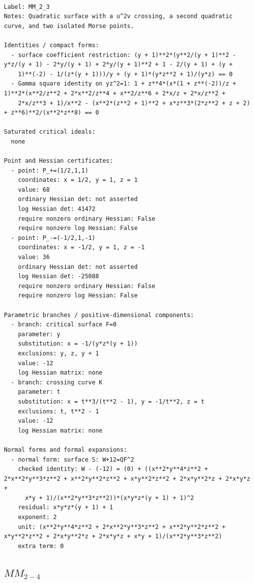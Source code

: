 \documentclass[10pt,a4paper]{article}
\begin{document}
\begin{lstlisting}

Label: MM_2_3
Notes: Quadratic surface with a u^2v crossing, a second quadratic curve, and two isolated Morse points.

Identities / compact forms:
  - surface coefficient restriction: (y + 1)**2*(y**2/(y + 1)**2 - y*z/(y + 1) - 2*y/(y + 1) + 2*y/(y + 1)**2 + 1 - 2/(y + 1) + (y +
    1)**(-2) - 1/(z*(y + 1)))/y + (y + 1)*(y*z**2 + 1)/(y*z) == 0
  - Gamma square identity on yz^2=1: 1 + z**4*(x*(1 + z**(-2))/z + 1)**2*(x**2/z**2 + 2*x**2/z**4 + x**2/z**6 + 2*x/z + 2*x/z**2 +
    2*x/z**3 + 1)/x**2 - (x**2*(z**2 + 1)**2 + x*z**3*(2*z**2 + z + 2) + z**6)**2/(x**2*z**8) == 0

Saturated critical ideals:
  none

Point and Hessian certificates:
  - point: P_+=(1/2,1,1)
    coordinates: x = 1/2, y = 1, z = 1
    value: 68
    ordinary Hessian det: not asserted
    log Hessian det: 41472
    require nonzero ordinary Hessian: False
    require nonzero log Hessian: False
  - point: P_-=(-1/2,1,-1)
    coordinates: x = -1/2, y = 1, z = -1
    value: 36
    ordinary Hessian det: not asserted
    log Hessian det: -25088
    require nonzero ordinary Hessian: False
    require nonzero log Hessian: False

Parametric branches / positive-dimensional components:
  - branch: critical surface F=0
    parameter: y
    substitution: x = -1/(y*z*(y + 1))
    exclusions: y, z, y + 1
    value: -12
    log Hessian matrix: none
  - branch: crossing curve K
    parameter: t
    substitution: x = t**3/(t**2 - 1), y = -1/t**2, z = t
    exclusions: t, t**2 - 1
    value: -12
    log Hessian matrix: none

Normal forms and formal expansions:
  - normal form: surface S: W+12=QF^2
    checked identity: W - (-12) = (0) + ((x**2*y**4*z**2 + 2*x**2*y**3*z**2 + x**2*y**2*z**2 + x*y**2*z**2 + 2*x*y**2*z + 2*x*y*z +
      x*y + 1)/(x**2*y**3*z**2))*(x*y*z*(y + 1) + 1)^2
    residual: x*y*z*(y + 1) + 1
    exponent: 2
    unit: (x**2*y**4*z**2 + 2*x**2*y**3*z**2 + x**2*y**2*z**2 + x*y**2*z**2 + 2*x*y**2*z + 2*x*y*z + x*y + 1)/(x**2*y**3*z**2)
    extra term: 0

\end{lstlisting}

\subsection*{$ MM_{2-4} $}
\end{document}
